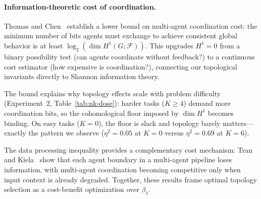\paragraph{Information-theoretic cost of coordination.}
Thomas and Chen~\cite{thomas2026shannon} establish a lower bound on
multi-agent coordination cost: the minimum number of bits agents must
exchange to achieve consistent global behavior is at least
$\log_2(\dim H^1(G;\mathcal{F}))$.
This upgrades $H^1 = 0$ from a binary possibility test (can agents
coordinate without feedback?) to a continuous cost estimator (how
expensive is coordination?), connecting our topological invariants
directly to Shannon information theory.

The bound explains why topology effects scale with problem difficulty
(Experiment~2, Table~\ref{tab:nk-dose}): harder tasks ($K \geq 4$)
demand more coordination bits, so the cohomological floor imposed by
$\dim H^1$ becomes binding.  On easy tasks ($K = 0$), the floor is
slack and topology barely matters---exactly the pattern we observe
($\eta^2 = 0.05$ at $K = 0$ versus $\eta^2 = 0.69$ at $K = 6$).

The data processing inequality provides a complementary cost
mechanism: Tran and Kiela~\cite{tran2026dpi} show that each agent
boundary in a multi-agent pipeline loses information, with
multi-agent coordination becoming competitive only when input context
is already degraded.  Together, these results frame optimal topology
selection as a cost-benefit optimization over $\beta_1$.

%


%
%

